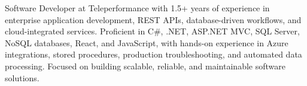 





\vspace{6pt}



\begin{cvparagraph}
Software Developer at Teleperformance with 1.5+ years of experience in enterprise application development, REST APIs, database-driven workflows, and cloud-integrated services. Proficient in C\#, .NET, ASP.NET MVC, SQL Server, NoSQL databases, React, and JavaScript, with hands-on experience in Azure integrations, stored procedures, production troubleshooting, and automated data processing. Focused on building scalable, reliable, and maintainable software solutions.
\end{cvparagraph}



\vspace{2pt}
